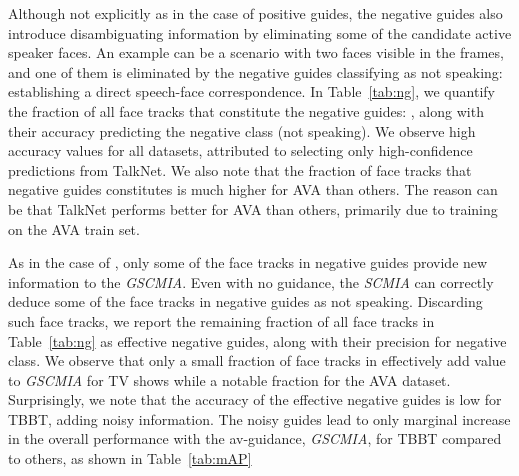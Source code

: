Although not explicitly as in the case of positive guides, the negative guides also introduce disambiguating information by eliminating some of the candidate active speaker faces. An example can be a scenario with two faces visible in the frames, and one of them is eliminated by the negative guides classifying as not speaking: establishing a direct speech-face correspondence. In Table~\ref{tab:ng}, we quantify the fraction of all face tracks that constitute the negative guides: , along with their accuracy predicting the negative class (not speaking). We observe high accuracy values for all datasets, attributed to selecting only high-confidence predictions from TalkNet. We also note that the fraction of face tracks that negative guides constitutes is much higher for AVA than others. The reason can be that TalkNet performs better for AVA than others, primarily due to training on the AVA train set. 
\begin{table}[]
\centering
\caption{Constituents of negative and effective negative guides and their exactness. All values are shown in \%.}
\label{tab:ng}
\end{table}

As in the case of , only some of the face tracks in negative guides provide new information to the \emph{GSCMIA}. Even with no guidance, the \emph{SCMIA} can correctly deduce some of the face tracks in negative guides as not speaking. Discarding such face tracks, we report the remaining fraction of all face tracks in Table~\ref{tab:ng} as effective negative guides, along with their precision for negative class. We observe that only a small fraction of face tracks in  effectively add value to \emph{GSCMIA} for TV shows while a notable fraction for the AVA dataset. Surprisingly, we note that the accuracy of the effective negative guides is low for TBBT, adding noisy information. The noisy guides lead to only marginal increase in the overall performance with the av-guidance, \emph{GSCMIA}, for TBBT compared to others, as shown in Table~\ref{tab:mAP}

